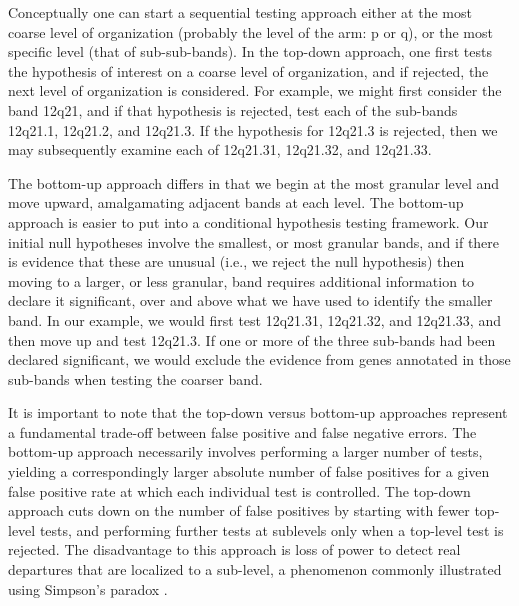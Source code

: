 \documentclass[11pt]{article}
\begin{document}
Conceptually one can start a sequential testing approach either at the
most coarse level of organization (probably the level of the arm: p or
q), or the most specific level (that of sub-sub-bands). In the
top-down approach, one first tests the hypothesis of interest on a
coarse level of organization, and if rejected, the next level of
organization is considered.  For example, we might first consider the
band 12q21, and if that hypothesis is rejected, test each of the
sub-bands 12q21.1, 12q21.2, and 12q21.3. If the hypothesis for 12q21.3
is rejected, then we may subsequently examine each of 12q21.31,
12q21.32, and 12q21.33.

The bottom-up approach differs in that we begin at the most granular
level and move upward, amalgamating adjacent bands at each level.  The
bottom-up approach is easier to put into a conditional hypothesis
testing framework.  Our initial null hypotheses involve the smallest,
or most granular bands, and if there is evidence that these are
unusual (i.e., we reject the null hypothesis) then moving to a larger,
or less granular, band requires additional information to declare it
significant, over and above what we have used to identify the smaller
band.  In our example, we would first test 12q21.31, 12q21.32, and
12q21.33, and then move up and test 12q21.3.  If one or more of the
three sub-bands had been declared significant, we would exclude the
evidence from genes annotated in those sub-bands when testing the
coarser band.

It is important to note that the top-down versus bottom-up approaches
represent a fundamental trade-off between false positive and false
negative errors.  The bottom-up approach necessarily involves
performing a larger number of tests, yielding a correspondingly larger
absolute number of false positives for a given false positive rate at
which each individual test is controlled.  The top-down approach cuts
down on the number of false positives by starting with fewer top-level
tests, and performing further tests at sublevels only when a top-level
test is rejected.  The disadvantage to this approach is loss of power
to detect real departures that are localized to a sub-level, a
phenomenon commonly illustrated using Simpson's paradox
\citep[see, e.g.,][]{Simpson1982}.
\end{document}
